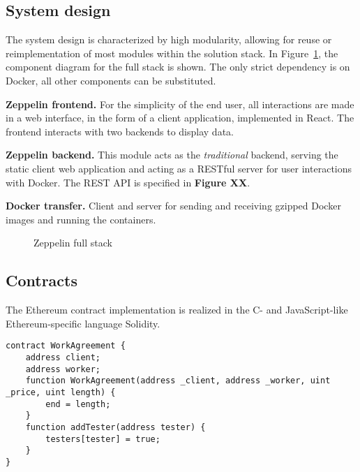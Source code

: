 \subsection{System design}
The system design is characterized by high modularity, allowing for reuse or reimplementation of most modules within the solution stack. In Figure~\ref{zep-stack}, the component diagram for the full stack is shown. The only strict dependency is on Docker, all other components can be substituted.

\textbf{Zeppelin frontend.} For the simplicity of the end user, all interactions are made in a web interface, in the form of a client application, implemented in React. The frontend interacts with two backends to display data.

\textbf{Zeppelin backend.} This module acts as the \textit{traditional} backend, serving the static client web application and acting as a RESTful server for user interactions with Docker. The REST API is specified in \textbf{Figure XX}.

\textbf{Docker transfer.} Client and server for sending and receiving gzipped Docker images and running the containers.

\begin{figure}[ht]
\centering
{}
\caption{Zeppelin full stack}
\label{zep-stack}
\end{figure}

\subsection{Contracts}
The Ethereum contract implementation is realized in the C- and JavaScript-like Ethereum-specific language Solidity.
\begin{lstlisting}[caption={WorkAgreement contract}, label={lst:workagreement}]
contract WorkAgreement {
    address client;
    address worker;
    function WorkAgreement(address _client, address _worker, uint _price, uint length) {
        end = length;
    }
    function addTester(address tester) {
        testers[tester] = true;
    }
}
\end{lstlisting}

